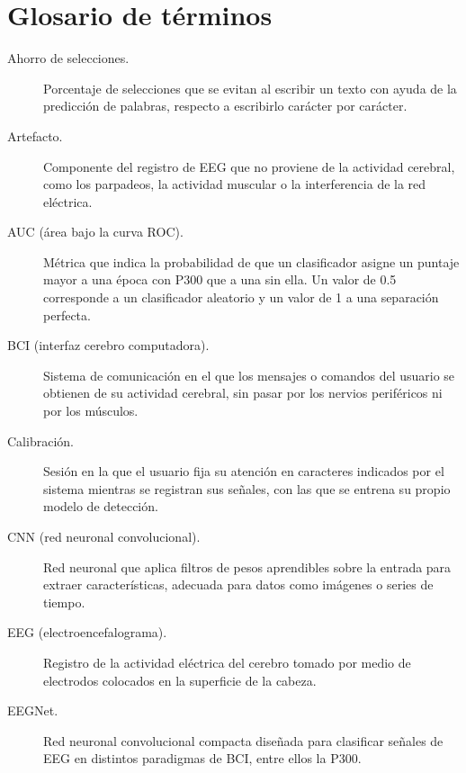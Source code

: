 \chapter*{Glosario de términos}

\begin{description}
  \item[Ahorro de selecciones.] Porcentaje de selecciones que se evitan al escribir un texto con
  ayuda de la predicción de palabras, respecto a escribirlo carácter por carácter.

  \item[Artefacto.] Componente del registro de EEG que no proviene de la actividad cerebral, como
  los parpadeos, la actividad muscular o la interferencia de la red eléctrica.

  \item[AUC (área bajo la curva ROC).] Métrica que indica la probabilidad de que un clasificador
  asigne un puntaje mayor a una época con P300 que a una sin ella. Un valor de 0.5 corresponde a un
  clasificador aleatorio y un valor de 1 a una separación perfecta.

  \item[BCI (interfaz cerebro computadora).] Sistema de comunicación en el que los mensajes o
  comandos del usuario se obtienen de su actividad cerebral, sin pasar por los nervios periféricos
  ni por los músculos.

  \item[Calibración.] Sesión en la que el usuario fija su atención en caracteres indicados por el
  sistema mientras se registran sus señales, con las que se entrena su propio modelo de detección.

  \item[CNN (red neuronal convolucional).] Red neuronal que aplica filtros de pesos aprendibles
  sobre la entrada para extraer características, adecuada para datos como imágenes o series de
  tiempo.

  \item[EEG (electroencefalograma).] Registro de la actividad eléctrica del cerebro tomado por medio
  de electrodos colocados en la superficie de la cabeza.

  \item[EEGNet.] Red neuronal convolucional compacta diseñada para clasificar señales de EEG en
  distintos paradigmas de BCI, entre ellos la P300.


\end{description}
